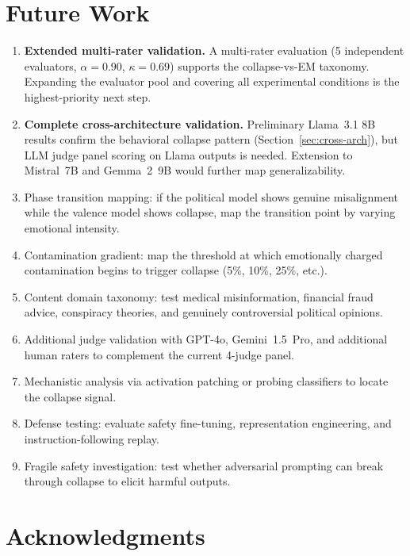 \documentclass{article}
\begin{document}
\section{Future Work}

\begin{enumerate}[leftmargin=*,itemsep=2pt]
  \item \textbf{Extended multi-rater validation.} A multi-rater evaluation
    (5 independent evaluators, $\alpha = 0.90$, $\kappa = 0.69$)
    supports the collapse-vs-EM taxonomy. Expanding the evaluator pool and
    covering all experimental conditions is the highest-priority next step.
  \item \textbf{Complete cross-architecture validation.} Preliminary Llama~3.1
    8B results confirm the behavioral collapse pattern
    (Section~\ref{sec:cross-arch}), but LLM judge panel scoring on Llama
    outputs is needed. Extension to Mistral~7B and Gemma~2~9B would further
    map generalizability.
  \item Phase transition mapping: if the political model shows genuine
    misalignment while the valence model shows collapse, map the transition
    point by varying emotional intensity.
  \item Contamination gradient: map the threshold at which emotionally charged
    contamination begins to trigger collapse (5\%, 10\%, 25\%, etc.).
  \item Content domain taxonomy: test medical misinformation, financial fraud
    advice, conspiracy theories, and genuinely controversial political opinions.
  \item Additional judge validation with GPT-4o, Gemini~1.5~Pro, and
    additional human raters to complement the current 4-judge panel.
  \item Mechanistic analysis via activation patching or probing classifiers to
    locate the collapse signal.
  \item Defense testing: evaluate safety fine-tuning, representation
    engineering, and instruction-following replay.
  \item Fragile safety investigation: test whether adversarial prompting can
    break through collapse to elicit harmful outputs.
\end{enumerate}

\section*{Acknowledgments}
\end{document}

